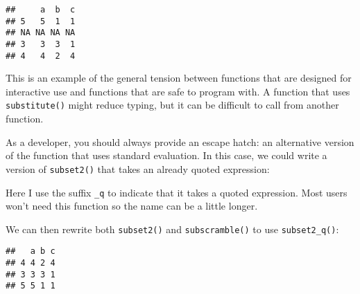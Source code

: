 \begin{verbatim}
##     a  b  c
## 5   5  1  1
## NA NA NA NA
## 3   3  3  1
## 4   4  2  4
\end{verbatim}

This is an example of the general tension between functions that are
designed for interactive use and functions that are safe to program
with. A function that uses \texttt{substitute()} might reduce typing,
but it can be difficult to call from another function.

As a developer, you should always provide an escape hatch: an
alternative version of the function that uses standard evaluation. In
this case, we could write a version of \texttt{subset2()} that takes an
already quoted expression:

\begin{Shaded}
\begin{Highlighting}[]
\StringTok{ }
\StringTok{ }\NormalTok{())}
\NormalTok{\}}
\end{Highlighting}
\end{Shaded}

Here I use the suffix \texttt{\_q} to indicate that it takes a quoted
expression. Most users won't need this function so the name can be a
little longer.

We can then rewrite both \texttt{subset2()} and \texttt{subscramble()}
to use \texttt{subset2\_q()}:

\begin{Shaded}
\begin{Highlighting}[]
\StringTok{ }
\NormalTok{\}}

\StringTok{ }
\StringTok{ }
  \NormalTok{(}
\NormalTok{\}}

\OperatorTok{>=}\StringTok{ }\NormalTok{)}
\end{Highlighting}
\end{Shaded}

\begin{verbatim}
##   a b c
## 4 4 2 4
## 3 3 3 1
## 5 5 1 1
\end{verbatim}

